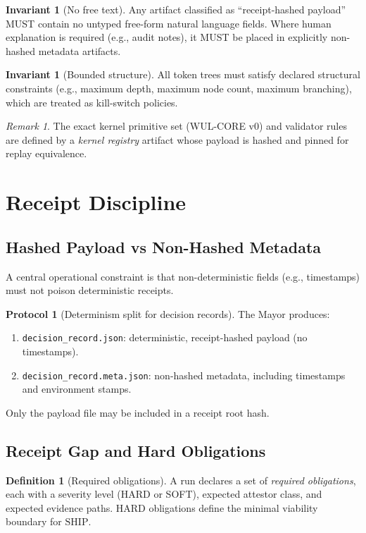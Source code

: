 \documentclass[11pt,a4paper]{article}
\theoremstyle{plain}
\theoremstyle{definition}
\newtheorem{definition}[theorem]{Definition}
\newtheorem{protocol}[theorem]{Protocol}
\newtheorem{invariant}[theorem]{Invariant}
\theoremstyle{remark}
\newtheorem{remark}[theorem]{Remark}
\newcommand{\SHIP}{\mathrm{SHIP}}
\begin{document}
\begin{invariant}[No free text]
\label{inv:no-free-text}
Any artifact classified as ``receipt-hashed payload'' MUST contain no untyped free-form natural language fields. Where human explanation is required (e.g., audit notes), it MUST be placed in explicitly non-hashed metadata artifacts.
\end{invariant}

\begin{invariant}[Bounded structure]
\label{inv:bounded}
All token trees must satisfy declared structural constraints (e.g., maximum depth, maximum node count, maximum branching), which are treated as kill-switch policies.
\end{invariant}

\begin{remark}
The exact kernel primitive set (WUL-CORE v0) and validator rules are defined by a \emph{kernel registry} artifact whose payload is hashed and pinned for replay equivalence.
\end{remark}

\section{Receipt Discipline}

\subsection{Hashed Payload vs Non-Hashed Metadata}
A central operational constraint is that non-deterministic fields (e.g., timestamps) must not poison deterministic receipts.

\begin{protocol}[Determinism split for decision records]
\label{prot:det-split}
The Mayor produces:
\begin{enumerate}[label=(\alph*)]
  \item \texttt{decision\_record.json}: deterministic, receipt-hashed payload (no timestamps).
  \item \texttt{decision\_record.meta.json}: non-hashed metadata, including timestamps and environment stamps.
\end{enumerate}
Only the payload file may be included in a receipt root hash.
\end{protocol}

\subsection{Receipt Gap and Hard Obligations}
\begin{definition}[Required obligations]
A run declares a set of \emph{required obligations}, each with a severity level (HARD or SOFT), expected attestor class, and expected evidence paths. HARD obligations define the minimal viability boundary for \(\SHIP\).
\end{definition}
\end{document}
